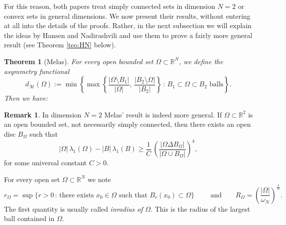 \documentclass{amsart}
\newtheorem{theorem}[lemma]{Theorem}
\theoremstyle{definition}
\newtheorem{remark}[lemma]{Remark}
\numberwithin{equation}{section}
\begin{document}
\par
For this reason, both papers treat simply connected sets in dimension $N=2$ or convex sets in general dimensions. We now present their results, without entering at all into the details of the proofs. Rather, in the next subsection we will explain the ideas by Hansen and Nadirashvili and use them to prove a fairly more general result (see Theorem \ref{teo:HN} below).
\begin{theorem}[Melas]
\label{teo:melas}
For every open bounded set $\Omega\subset\mathbb{R}^N$, we define the asymmetry functional
\begin{equation}
\label{melas}
d_{\mathcal{M}}(\Omega):=\min\left\{\max\left\{\frac{|\Omega\setminus B_1|}{|\Omega|},\,\frac{|B_2\setminus \Omega|}{|B_2|}\right\}\, :\, B_1\subset \Omega\subset B_2 \mbox{ balls}\right\}.
\end{equation}
Then we have:
\end{theorem}
\begin{remark}
In dimension $N=2$ Melas' result is indeed more general. If $\Omega\subset\mathbb{R}^2$ is an open bounded set, not necessarily simply connected, then there exists an open disc $B_\Omega$ such that
\[
|\Omega|\,\lambda_1(\Omega)-|B|\,\lambda_1(B)\ge \frac{1}{C}\,\left(\frac{|\Omega\Delta B_\Omega|}{|\Omega\cup B_\Omega|}\right)^4,
\]
for some universal constant $C>0$.
\end{remark}
\noindent
For every open set $\Omega\subset\mathbb{R}^N$ we note
\[
r_\Omega=\sup\{r>0\, :\, \mbox{there exists }x_0\in\Omega \mbox{ such that } B_r(x_0)\subset\Omega\}\qquad \mbox{ and} \qquad R_{\Omega}=\left(\frac{|\Omega|}{\omega_N}\right)^\frac{1}{N}.
\]
The first quantity is usually called {\it inradius of $\Omega$}. This is the radius of the largest ball contained in $\Omega$.
\end{document}
